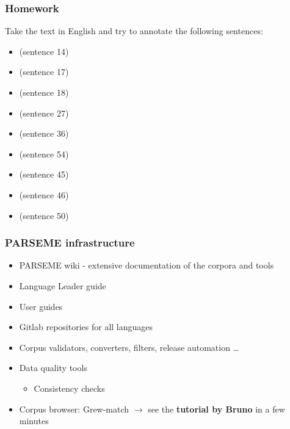 \documentclass[xcolor=dvipsnames]{beamer}
\begin{document}
\begin{frame} 
\frametitle{Homework}

Take the text in English and try to annotate the following sentences:

\begin{block}{}
\begin{itemize}
\item {} (sentence 14)
\item {} (sentence 17)
\item {} (sentence 18)
\item {} (sentence 27)
\item {} (sentence 36)
\item {} (sentence 54)
\item {} (sentence 45)
\item {} (sentence 46)
\item {} (sentence 50)
\end{itemize}
\end{block}

\end{frame}

\begin{frame} 
\frametitle{PARSEME infrastructure}

\begin{block}{}
\begin{itemize}
\item PARSEME wiki - extensive documentation of the corpora and tools  \href{https://gitlab.com/parseme/corpora/-/wikis}{\beamergotobutton{[link]}}
\item Language Leader guide
\item User guides
\item Gitlab repositories for all languages %
\item Corpus validators, converters, filters, release automation \ldots
\item Data quality tools
   \begin{itemize}
   \item Consistency checks %
   \end{itemize} 
\item Corpus browser: Grew-match $\longrightarrow$ see the \textbf{tutorial by Bruno} in a few minutes
\end{itemize}
\end{block}

\end{frame}
\end{document}
